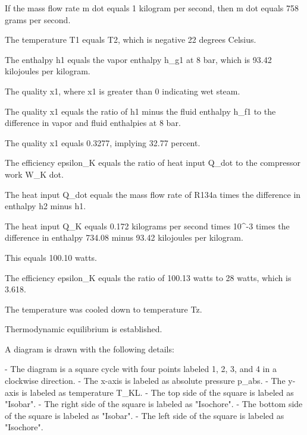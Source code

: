 If the mass flow rate m dot equals 1 kilogram per second, then m dot equals 758 grams per second.

The temperature T1 equals T2, which is negative 22 degrees Celsius.

The enthalpy h1 equals the vapor enthalpy h_g1 at 8 bar, which is 93.42 kilojoules per kilogram.

The quality x1, where x1 is greater than 0 indicating wet steam.

The quality x1 equals the ratio of h1 minus the fluid enthalpy h_f1 to the difference in vapor and fluid enthalpies at 8 bar.

The quality x1 equals 0.3277, implying 32.77 percent.

The efficiency epsilon_K equals the ratio of heat input Q_dot to the compressor work W_K dot.

The heat input Q_dot equals the mass flow rate of R134a times the difference in enthalpy h2 minus h1.

The heat input Q_K equals 0.172 kilograms per second times 10^-3 times the difference in enthalpy 734.08 minus 93.42 kilojoules per kilogram.

This equals 100.10 watts.

The efficiency epsilon_K equals the ratio of 100.13 watts to 28 watts, which is 3.618.

The temperature was cooled down to temperature Tz.

Thermodynamic equilibrium is established.

A diagram is drawn with the following details:

- The diagram is a square cycle with four points labeled 1, 2, 3, and 4 in a clockwise direction.
- The x-axis is labeled as absolute pressure p_abs.
- The y-axis is labeled as temperature T_KL.
- The top side of the square is labeled as "Isobar".
- The right side of the square is labeled as "Isochore".
- The bottom side of the square is labeled as "Isobar".
- The left side of the square is labeled as "Isochore".